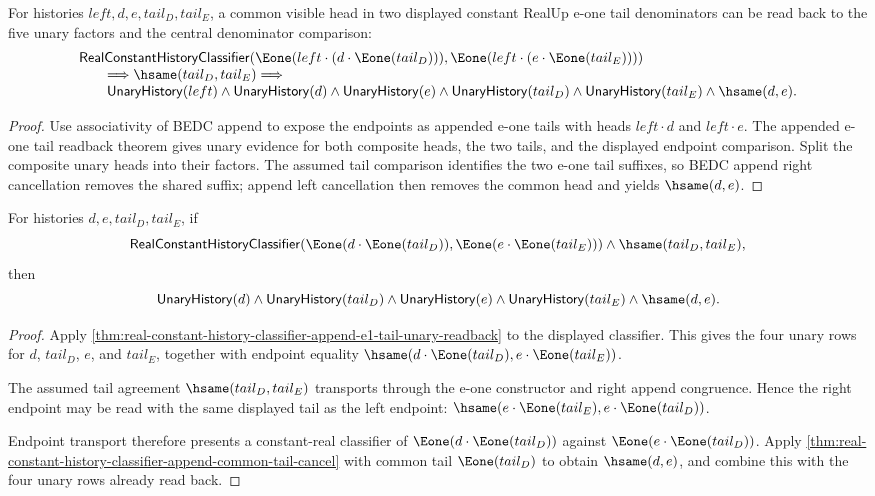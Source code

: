 \begin{theorem}
\label{thm:real-constant-history-classifier-append-common-head-e1-tail-readback}
For histories $left,d,e,tail_D,tail_E$, a common visible head in two displayed
constant RealUp e-one tail denominators can be read back to the five unary
factors and the central denominator comparison:
$$
\begin{array}{l}
\mathsf{RealConstantHistoryClassifier}
  (\Eone(left\cdot(d\cdot\Eone(tail_D))),
   \Eone(left\cdot(e\cdot\Eone(tail_E))))\\
\qquad\Longrightarrow
\hsame(tail_D,tail_E)\Longrightarrow\\
\qquad
\mathsf{UnaryHistory}(left)\land
\mathsf{UnaryHistory}(d)\land
\mathsf{UnaryHistory}(e)\land
\mathsf{UnaryHistory}(tail_D)\land
\mathsf{UnaryHistory}(tail_E)\land
\hsame(d,e).
\end{array}
$$
\end{theorem}
\begin{proof}
Use associativity of BEDC append to expose the endpoints as appended e-one
tails with heads $left\cdot d$ and $left\cdot e$. The appended e-one tail
readback theorem gives unary evidence for both composite heads, the two tails,
and the displayed endpoint comparison. Split the composite unary heads into
their factors. The assumed tail comparison identifies the two e-one tail
suffixes, so BEDC append right cancellation removes the shared suffix; append
left cancellation then removes the common head and yields $\hsame(d,e)$.
\end{proof}
\begin{theorem}
\label{thm:real-constant-classifier-appended-e1-matched-tail-head-readback}
For histories $d,e,tail_D,tail_E$, if
$$
\mathsf{RealConstantHistoryClassifier}(\Eone(d\cdot\Eone(tail_D)),
  \Eone(e\cdot\Eone(tail_E)))\land
\hsame(tail_D,tail_E),
$$
then
$$
\mathsf{UnaryHistory}(d)\land\mathsf{UnaryHistory}(tail_D)\land
\mathsf{UnaryHistory}(e)\land\mathsf{UnaryHistory}(tail_E)\land
\hsame(d,e).
$$
\end{theorem}
\begin{proof}
Apply
\autoref{thm:real-constant-history-classifier-append-e1-tail-unary-readback}
to the displayed classifier. This gives the four unary rows for $d$,
$tail_D$, $e$, and $tail_E$, together with endpoint equality
$\hsame(d\cdot\Eone(tail_D),e\cdot\Eone(tail_E))$.

The assumed tail agreement $\hsame(tail_D,tail_E)$ transports through the
e-one constructor and right append congruence. Hence the right endpoint may be
read with the same displayed tail as the left endpoint:
$\hsame(e\cdot\Eone(tail_E),e\cdot\Eone(tail_D))$.

Endpoint transport therefore presents a constant-real classifier of
$\Eone(d\cdot\Eone(tail_D))$ against $\Eone(e\cdot\Eone(tail_D))$. Apply
\autoref{thm:real-constant-history-classifier-append-common-tail-cancel} with
common tail $\Eone(tail_D)$ to obtain $\hsame(d,e)$, and combine this with the
four unary rows already read back.
\end{proof}
